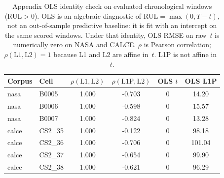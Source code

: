 \begin{table}[htbp]
\centering
\caption{Appendix OLS identity check on evaluated chronological windows (RUL$>0$).
OLS is an algebraic diagnostic of $\mathrm{RUL}=\max(0,T-t)$, not an out-of-sample predictive baseline: it is fit with an intercept on the same scored windows.
Under that identity, OLS RMSE on raw~$t$ is numerically zero on NASA and CALCE.
$\rho$ is Pearson correlation; $\rho(\mathrm{L1},\mathrm{L2})=1$ because L1 and L2 are affine in~$t$.
L1P is not affine in~$t$.}
\label{tab:clock}
\begin{tabular}{@{}llcccc@{}}
\toprule
Corpus & Cell & $\rho(\mathrm{L1},\mathrm{L2})$ & $\rho(\mathrm{L1P},\mathrm{L2})$ & OLS $t$ & OLS L1P \\
\midrule
nasa & B0005 & 1.000 & -0.703 & 0 & 14.20 \\
nasa & B0006 & 1.000 & -0.598 & 0 & 15.57 \\
nasa & B0007 & 1.000 & -0.824 & 0 & 13.28 \\
calce & CS2\_35 & 1.000 & -0.122 & 0 & 98.18 \\
calce & CS2\_36 & 1.000 & -0.706 & 0 & 101.04 \\
calce & CS2\_37 & 1.000 & -0.654 & 0 & 99.90 \\
calce & CS2\_38 & 1.000 & -0.621 & 0 & 96.29 \\
\bottomrule
\end{tabular}
\end{table}

